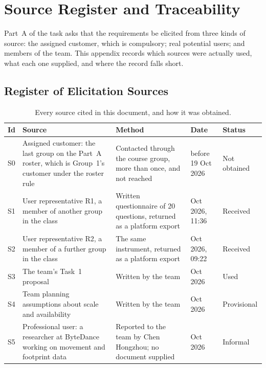 \documentclass[12pt,a4paper]{report}
\begin{document}
\chapter{Source Register and Traceability}
\label{ch:appendix}

Part~A of the task asks that the requirements be elicited from three kinds of
source: the assigned customer, which is compulsory; real potential users; and
members of the team. This appendix records which sources were actually used,
what each one supplied, and where the record falls short.

\section{Register of Elicitation Sources}
\label{sec:sources}

\begin{table}[H]
  \centering
  \caption{Every source cited in this document, and how it was obtained.}
  \label{tab:sources}
  \setlength{\tabcolsep}{4.5pt}
  \begin{tabular}{@{}l >{\raggedright\arraybackslash}p{3.9cm}
                    >{\raggedright\arraybackslash}p{4.5cm}
                    >{\raggedright\arraybackslash}p{2.6cm} l@{}}
    \toprule[1.5pt]
    \textbf{Id} & \textbf{Source} & \textbf{Method} & \textbf{Date} &
      \textbf{Status} \\
    \midrule
    S0 & Assigned customer: the last group on the Part~A roster, which is
      Group~1's customer under the roster rule & Contacted through the course
      group, more than once, and not reached
      & before 19 Oct 2026 & Not obtained \\
    \addlinespace
    S1 & User representative R1, a member of another group in the class &
      Written questionnaire of 20 questions, returned as a platform export &
      19 Oct 2026, 11:36 & Received \\
    \addlinespace
    S2 & User representative R2, a member of a further group in the class &
      The same instrument, returned as a platform export &
      20 Oct 2026, 09:22 & Received \\
    \addlinespace
    S3 & The team's Task~1 proposal & Written by the team &
      7 Oct 2026 & Used \\
    \addlinespace
    S4 & Team planning assumptions about scale and availability & Written
      by the team & 20 Oct 2026 & Provisional \\
    \addlinespace
    S5 & Professional user: a researcher at ByteDance working on movement
      and footprint data & Reported to the team by Chen Hongzhou; no document
      supplied & 20 Oct 2026 & Informal \\
    \bottomrule[1.5pt]
  \end{tabular}
\end{table}
\end{document}
